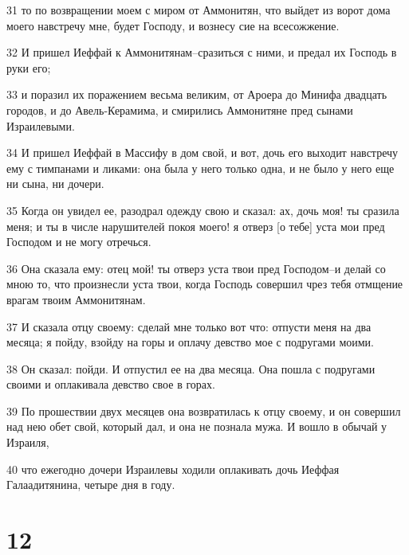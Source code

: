 \par 31 то по возвращении моем с миром от Аммонитян, что выйдет из ворот дома моего навстречу мне, будет Господу, и вознесу сие на всесожжение.
\par 32 И пришел Иеффай к Аммонитянам--сразиться с ними, и предал их Господь в руки его;
\par 33 и поразил их поражением весьма великим, от Ароера до Минифа двадцать городов, и до Авель-Керамима, и смирились Аммонитяне пред сынами Израилевыми.
\par 34 И пришел Иеффай в Массифу в дом свой, и вот, дочь его выходит навстречу ему с тимпанами и ликами: она была у него только одна, и не было у него еще ни сына, ни дочери.
\par 35 Когда он увидел ее, разодрал одежду свою и сказал: ах, дочь моя! ты сразила меня; и ты в числе нарушителей покоя моего! я отверз [о тебе] уста мои пред Господом и не могу отречься.
\par 36 Она сказала ему: отец мой! ты отверз уста твои пред Господом--и делай со мною то, что произнесли уста твои, когда Господь совершил чрез тебя отмщение врагам твоим Аммонитянам.
\par 37 И сказала отцу своему: сделай мне только вот что: отпусти меня на два месяца; я пойду, взойду на горы и оплачу девство мое с подругами моими.
\par 38 Он сказал: пойди. И отпустил ее на два месяца. Она пошла с подругами своими и оплакивала девство свое в горах.
\par 39 По прошествии двух месяцев она возвратилась к отцу своему, и он совершил над нею обет свой, который дал, и она не познала мужа. И вошло в обычай у Израиля,
\par 40 что ежегодно дочери Израилевы ходили оплакивать дочь Иеффая Галаадитянина, четыре дня в году.

\chapter{12}

